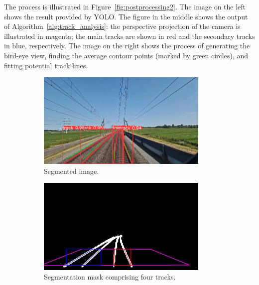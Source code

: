 \documentclass[Master,MDS,english]{BASE/twbook} %
\begin{document}
 The process is illustrated in Figure~\ref{fig:postprocessing2}. The image on the left shows the result provided by YOLO. The figure in the middle shows the output of Algorithm~\ref{alg:track_analysis}: the perspective projection of the camera is illustrated in magenta; the main tracks are shown in red and the secondary tracks in blue, respectively. The image on the right shows the process of generating the bird-eye view, finding the average contour points (marked by green circles), and fitting potential track lines.



\begin{figure}[H]
\centering
\begin{subfigure}[t]{.395\textwidth}
  \centering
  \includegraphics[width=0.9\textwidth]{images/streaming/img3}
  \caption{Segmented image.}
\end{subfigure}%
\begin{subfigure}[t]{.395\textwidth}
  \centering
  \includegraphics[width=0.9\textwidth]{images/streaming/img2}
  \caption{Segmentation mask comprising four tracks.}
\end{subfigure}%
\begin{subfigure}[t]{.215\textwidth}

\end{subfigure}
\end{figure}
\end{document}
